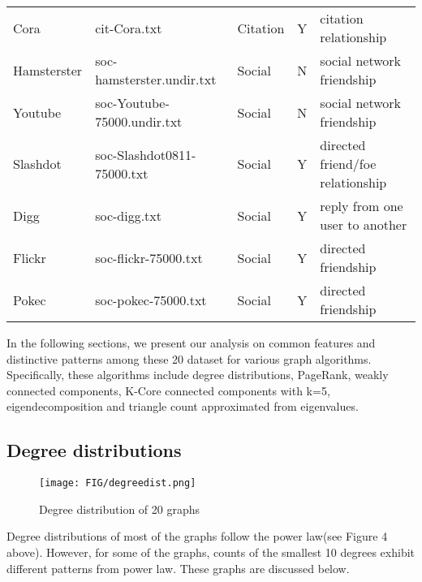 \begin{table}[h]
\begin{tabular}{lllll}
Cora           & cit-Cora.txt                 & Citation      & Y        & citation relationship                  \\
Hamsterster    & soc-hamsterster.undir.txt    & Social        & N        & social network friendship              \\
Youtube        & soc-Youtube-75000.undir.txt  & Social        & N        & social network friendship              \\
Slashdot       & soc-Slashdot0811-75000.txt   & Social        & Y        & directed friend/foe relationship       \\
Digg           & soc-digg.txt                 & Social        & Y        & reply from one user to another         \\
Flickr         & soc-flickr-75000.txt         & Social        & Y        & directed friendship                    \\
Pokec          & soc-pokec-75000.txt          & Social        & Y        & directed friendship                                       \\ \hline
\end{tabular}
\end{table}

In the following sections, we present our analysis on common features and distinctive patterns among these 20 dataset for various graph algorithms. Specifically, these algorithms include degree distributions, PageRank, weakly connected components, K-Core connected components with k=5, eigendecomposition and triangle count approximated from eigenvalues.

\subsection{Degree distributions}
\begin{figure}[H]
\begin{center}
\texttt{[image: FIG/degreedist.png]}
\caption{Degree distribution of 20 graphs}
\end{center}
\end{figure}

\par Degree distributions of most of the graphs follow the power law(see Figure 4 above). However, for some of the graphs, counts of the smallest 10 degrees exhibit different patterns from power law. These graphs are discussed below.

